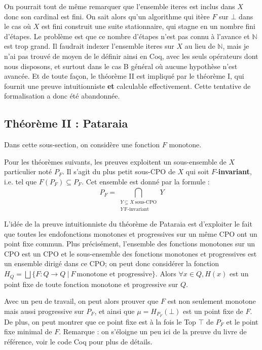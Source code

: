 \documentclass{article}
\newcommand\code[1]{{\fontfamily{lmtt}\selectfont #1}}
\theoremstyle{definition}
\begin{document}
On pourrait tout de même remarquer que l'ensemble \code{iteres} est inclus dans $X$ donc son cardinal est fini. On sait alors qu'un algorithme qui itère $F$ sur $\bot$ dans le cas où $X$ est fini construit une suite stationnaire, qui stagne en un nombre fini d'étapes. Le problème est que ce nombre d'étapes n'est pas connu à l'avance et $\mathbb{N}$ est trop grand. Il faudrait indexer l'ensemble \code{iteres} sur $X$ au lieu de $\mathbb{N}$, mais je n'ai pas trouvé de moyen de le définir ainsi en Coq, avec les seuls opérateurs dont nous disposons, et surtout dans le cas \code{B} général où aucune hypothèse n'est avancée. Et de toute façon, le théorème II est impliqué par le théorème I, qui fournit une preuve intuitionniste \textbf{et} calculable effectivement. Cette tentative de formalisation a donc été abandonnée.

\subsection{Théorème II : Pataraia}

Dans cette sous-section, on considère une fonction $F$ monotone. 

Pour les théorèmes suivants, les preuves exploitent un sous-ensemble de $X$ particulier noté $P_F$. Il s'agit du plus petit sous-CPO de $X$ qui soit $F$-\textbf{invariant}, i.e. tel que $F (P_F) \subseteq P_F$. Cet ensemble est donné par la formule : ~ 
$$P_F = \bigcap\limits_{\substack{Y \subseteq X ~ \text{sous-CPO}\\ Y ~ \text{F-invariant}}}^{}Y$$

L'idée de la preuve intuitionniste du théorème de Pataraia est d'exploiter le fait que toutes les endofonctions monotones et progressives sur un même CPO ont un point fixe commun. Plus précisément, l'ensemble des fonctions monotones sur un CPO est un CPO et le sous-ensemble des fonctions monotones et progressives est un ensemble dirigé dans ce CPO; on peut donc considérer la fonction $H_Q = \bigsqcup \{F : Q \rightarrow Q ~ | ~ F ~ \text{monotone et progressive} \}$. Alors $\forall x \in Q, H(x)$ est un point fixe de toute fonction monotone et progressive sur $Q$.

Avec un peu de travail, on peut alors prouver que $F$ est non seulement monotone mais aussi progressive sur $P_F$, et ainsi que $\mu = H_{P_F}(\bot)$ est un point fixe de $F$. De plus, on peut montrer que ce point fixe est à la fois le Top $\top$ de $P_F$ et le point fixe minimal de $F$. Remarque : on s'éloigne un peu ici de la preuve du livre de référence, voir le code Coq pour plus de détails.
\end{document}

